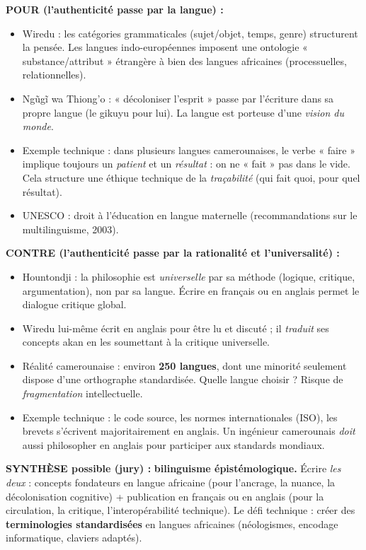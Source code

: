 \documentclass[11pt]{article}
\begin{document}
\begin{exemplebox}
\textbf{POUR (l'authenticité passe par la langue) :}
\begin{itemize}
\item Wiredu : les catégories grammaticales (sujet/objet, temps, genre) structurent la pensée. Les langues indo-européennes imposent une ontologie « substance/attribut » étrangère à bien des langues africaines (processuelles, relationnelles).
\item Ngũgĩ wa Thiong'o : « décoloniser l'esprit » passe par l'écriture dans sa propre langue (le gikuyu pour lui). La langue est porteuse d'une \emph{vision du monde}.
\item Exemple technique : dans plusieurs langues camerounaises, le verbe « faire » implique toujours un \emph{patient} et un \emph{résultat} : on ne « fait » pas dans le vide. Cela structure une éthique technique de la \emph{traçabilité} (qui fait quoi, pour quel résultat).
\item UNESCO : droit à l'éducation en langue maternelle (recommandations sur le multilinguisme, 2003).
\end{itemize}

\textbf{CONTRE (l'authenticité passe par la rationalité et l'universalité) :}
\begin{itemize}
\item Hountondji : la philosophie est \emph{universelle} par sa méthode (logique, critique, argumentation), non par sa langue. Écrire en français ou en anglais permet le dialogue critique global.
\item Wiredu lui-même écrit en anglais pour être lu et discuté ; il \emph{traduit} ses concepts akan en les soumettant à la critique universelle.
\item Réalité camerounaise : environ \textbf{250 langues}, dont une minorité seulement dispose d'une orthographe standardisée. Quelle langue choisir ? Risque de \emph{fragmentation} intellectuelle.
\item Exemple technique : le code source, les normes internationales (ISO), les brevets s'écrivent majoritairement en anglais. Un ingénieur camerounais \emph{doit} aussi philosopher en anglais pour participer aux standards mondiaux.
\end{itemize}

\textbf{SYNTHÈSE possible (jury) :} \textbf{bilinguisme épistémologique.} Écrire \emph{les deux} : concepts fondateurs en langue africaine (pour l'ancrage, la nuance, la décolonisation cognitive) + publication en français ou en anglais (pour la circulation, la critique, l'interopérabilité technique). Le défi technique : créer des \textbf{terminologies standardisées} en langues africaines (néologismes, encodage informatique, claviers adaptés).
\end{exemplebox}
\end{document}
